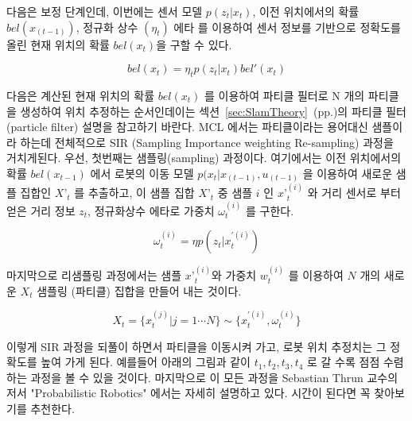 다음은 보정 단계인데, 이번에는 센서 모델 $p( z_t | x_t )$, 이전 위치에서의 확률 $bel(x_{(t-1)})$, 정규화 상수 $(\eta_t)$ 에타 를 이용하여 센서 정보를 기반으로 정확도를 올린 현재 위치의 확률  $bel(x_t)$을 구할 수 있다.

\begin{equation}
  bel(x_t) = \eta_t p(z_t|x_t)bel'(x_t)
\end{equation}

다음은 계산된 현재 위치의 확률 $bel(x_t)$ 를 이용하여 파티클 필터로 N 개의 파티클을 생성하여 위치 추정하는 순서인데이는 섹션~\ref{sec:SlamTheory}~(pp.\pageref{sec:SlamTheory})의 파티클 필터(particle filter) 설명을 참고하기 바란다. MCL 에서는 파티클이라는 용어대신 샘플이라 하는데 전체적으로 SIR (Sampling Importance weighting Re-sampling) 과정을 거치게된다. 우선, 첫번째는 샘플링(sampling) 과정이다. 여기에서는 이전 위치에서의 확률 $bel(x_{t-1})$ 에서 로봇의 이동 모델 $p( x_t | x_{(t-1)}, u_{(t-1)}$ 을 이용하여 새로운 샘플 집합인 ${X’}_t$  를 추출하고, 이 샘플 집합 $X{’}_t$ 중 샘플 $i$ 인 ${x’}_t^{(i)}$ 와 거리 센서로 부터 얻은 거리 정보 $z_t$, 정규화상수 에타로 가중치 $\omega_t^{(i)}$ 를 구한다. 

\begin{equation}
  \omega_t^{(i)} = \eta p(z_t|x_t^{\prime(i)})
\end{equation}

마지막으로 리샘플링 과정에서는 샘플 ${x’}_t^{(i)}$와 가중치 $w_t^{(i)}$ 를 이용하여 $N$ 개의 새로운 $X_t$ 샘플링 (파티클) 집합을 만들어 내는 것이다. 

\begin{equation}
  X_t = \{x_t^{(j)} | j=1 \cdots N\} \sim \{x_t^{\prime(i)},\omega_t^{(i)}\}
\end{equation}

이렇게 SIR 과정을 되풀이 하면서 파티클을 이동시켜 가고, 로봇 위치 추정치는 그 정확도를 높여 가게 된다. 예를들어 아래의 그림과 같이 $t_1, t_2, t_3, t_4$ 로 갈 수록 점점 수렴하는 과정을 볼 수 있을 것이다. 마지막으로 이 모든 과정을 Sebastian Thrun 교수의 저서 "Probabilistic Robotics"  에서는 자세히 설명하고 있다. 시간이 된다면 꼭 찾아보기를 추천한다. 

